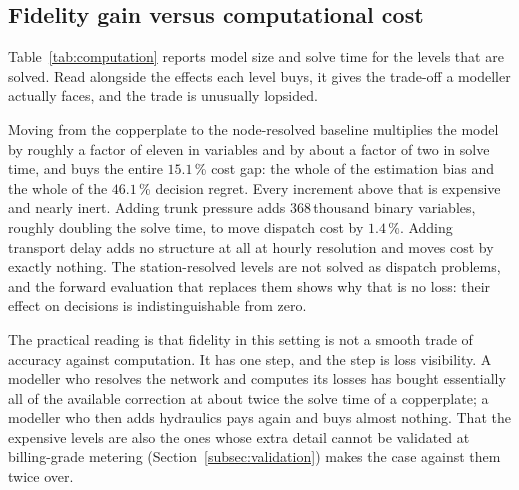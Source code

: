 
\subsection{Fidelity gain versus computational cost}
\label{subsec:computation}

Table~\ref{tab:computation} reports model size and solve time for the levels that are
solved. Read alongside the effects each level buys, it gives the trade-off a modeller
actually faces, and the trade is unusually lopsided.

Moving from the copperplate to the node-resolved baseline multiplies the model by roughly
a factor of eleven in variables and by about a factor of two in solve time, and buys the
entire $15.1$\,\% cost gap: the whole of the estimation bias and the whole of the
$46.1$\,\% decision regret. Every increment above that is expensive and nearly inert.
Adding trunk pressure adds $368$\,thousand binary variables, roughly doubling the solve
time, to move dispatch cost by $1.4$\,\%. Adding transport delay adds no structure at all
at hourly resolution and moves cost by exactly nothing. The station-resolved levels are
not solved as dispatch problems, and the forward evaluation that replaces them shows why
that is no loss: their effect on decisions is indistinguishable from zero.

The practical reading is that fidelity in this setting is not a smooth trade of accuracy
against computation. It has one step, and the step is loss visibility. A modeller who
resolves the network and computes its losses has bought essentially all of the available
correction at about twice the solve time of a copperplate; a modeller who then adds
hydraulics pays again and buys almost nothing. That the expensive levels are also the ones
whose extra detail cannot be validated at billing-grade metering
(Section~\ref{subsec:validation}) makes the case against them twice over.

